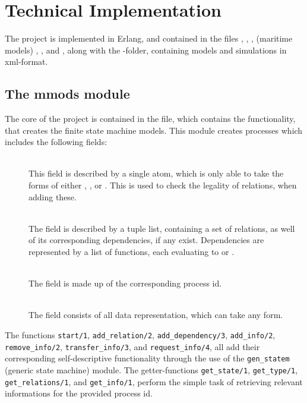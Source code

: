 \section{Technical Implementation}
The project is implemented in Erlang, and contained in the files , , , (maritime models) , , and , along with the -folder, containing models and simulations in xml-format.

\subsection{The mmods module}
The core of the project is contained in the  file, which contains the functionality, that creates the finite state machine models. This module creates processes which includes the following fields:
\begin{description}
	\item[]\ \\
		This field is described by a single atom, which is only able to take the forms of either , , or . This is used to check the legality of relations, when adding these.
	\item[]\ \\
		The  field is described by a tuple list, containing a set of relations, as well of its corresponding dependencies, if any exist. Dependencies are represented by a list of functions, each evaluating to  or .
	\item[]\ \\
		The  field is made up of the corresponding process id.
	\item[]\ \\
		The  field consists of all data representation, which can take any form.
\end{description}
The functions \lstinline{start/1}, \lstinline{add_relation/2}, \lstinline{add_dependency/3}, \lstinline{add_info/2}, \linebreak \lstinline{remove_info/2}, \lstinline{transfer_info/3}, and \lstinline{request_info/4}, all add their corresponding self-descriptive functionality through the use of the \lstinline{gen_statem} (generic state machine) module. The getter-functions \lstinline{get_state/1}, \lstinline{get_type/1}, \lstinline{get_relations/1}, and \lstinline{get_info/1}, perform the simple task of retrieving relevant informations for the provided process id.


